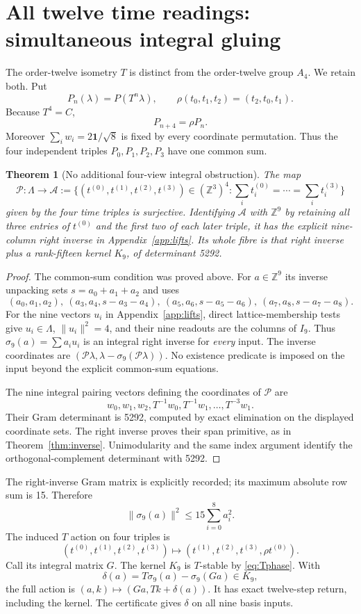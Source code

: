 \documentclass[11pt,reqno]{amsart}
\newtheorem{theorem}{Theorem}[section]
\theoremstyle{definition}\newtheorem{definition}[theorem]{Definition}
\theoremstyle{remark}\newtheorem{remark}[theorem]{Remark}
\newcommand{\Z}{\mathbb Z}\newcommand{\Q}{\mathbb Q}\newcommand{\R}{\mathbb R}\newcommand{\F}{\mathbb F}
\newcommand{\La}{\Lambda}\newcommand{\tr}{\operatorname{tr}}\newcommand{\Span}{\operatorname{span}}
\begin{document}
\section{All twelve time readings: simultaneous integral gluing}
The order-twelve isometry $T$ is distinct from the order-twelve group $A_4$. We retain both. Put
\[
P_n(\lambda)=P(T^n\lambda),\qquad
\rho(t_0,t_1,t_2)=(t_2,t_0,t_1).
\]
Because $T^4=C$,
\begin{equation}\label{eq:Tphase}
P_{n+4}=\rho P_n.
\end{equation}
Moreover $\sum_iw_i=2\mathbf1/\sqrt8$ is fixed by every coordinate permutation. Thus the four independent triples $P_0,P_1,P_2,P_3$ have one common sum.

\begin{theorem}[No additional four-view integral obstruction]\label{thm:nine}
The map
\[
\mathscr P:\La\longrightarrow\mathcal A:=
\{(t^{(0)},t^{(1)},t^{(2)},t^{(3)})\in(\Z^3)^4:
\sum_i t_i^{(0)}=\cdots=\sum_i t_i^{(3)}\}
\]
given by the four time triples is surjective. Identifying $\mathcal A$ with $\Z^9$ by retaining all three entries of $t^{(0)}$ and the first two of each later triple, it has the explicit nine-column right inverse in Appendix~\ref{app:lifts}. Its whole fibre is that right inverse plus a rank-fifteen kernel $K_9$, of determinant 5292.
\end{theorem}
\begin{proof}
The common-sum condition was proved above. For $a\in\Z^9$ its inverse unpacking sets $s=a_0+a_1+a_2$ and uses
\[
(a_0,a_1,a_2),\ (a_3,a_4,s-a_3-a_4),\
(a_5,a_6,s-a_5-a_6),\ (a_7,a_8,s-a_7-a_8).
\]
For the nine vectors $u_i$ in Appendix~\ref{app:lifts}, direct lattice-membership tests give $u_i\in\La$, $\|u_i\|^2=4$, and their nine readouts are the columns of $I_9$. Thus $\sigma_9(a)=\sum a_i u_i$ is an integral right inverse for \emph{every} input. The inverse coordinates are $(\mathscr P\lambda,\lambda-\sigma_9(\mathscr P\lambda))$. No existence predicate is imposed on the input beyond the explicit common-sum equations.

The nine integral pairing vectors defining the coordinates of $\mathscr P$ are
\[w_0,w_1,w_2,T^{-1}w_0,T^{-1}w_1,\ldots,T^{-3}w_1.\]
Their Gram determinant is 5292, computed by exact elimination on the displayed coordinate sets. The right inverse proves their span primitive, as in Theorem~\ref{thm:inverse}. Unimodularity and the same index argument identify the orthogonal-complement determinant with 5292.
\end{proof}
The right-inverse Gram matrix is explicitly recorded; its maximum absolute row sum is 15. Therefore
\[
\|\sigma_9(a)\|^2\le15\sum_{i=0}^8a_i^2.
\]
The induced $T$ action on four triples is
\[
(t^{(0)},t^{(1)},t^{(2)},t^{(3)})
\longmapsto(t^{(1)},t^{(2)},t^{(3)},\rho t^{(0)}).
\]
Call its integral matrix $G$. The kernel $K_9$ is $T$-stable by \eqref{eq:Tphase}. With
\[
\delta(a)=T\sigma_9(a)-\sigma_9(Ga)\in K_9,
\]
the full action is $(a,k)\mapsto(Ga,Tk+\delta(a))$. It has exact twelve-step return, including the kernel. The certificate gives $\delta$ on all nine basis inputs.
\end{document}
